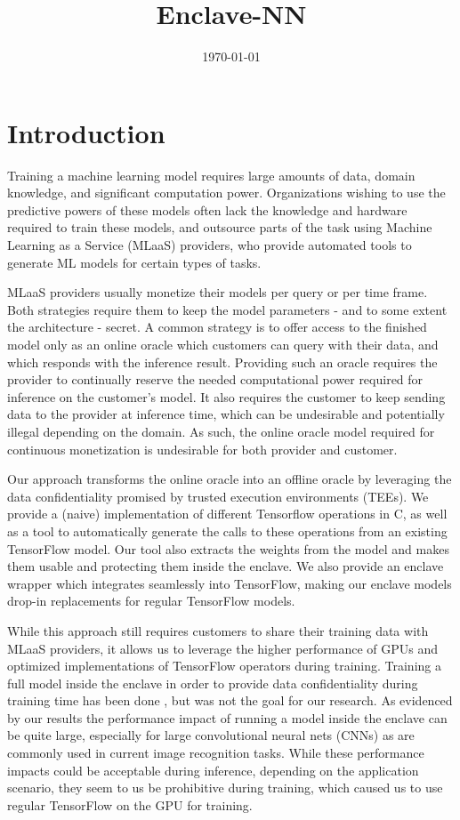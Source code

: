 \documentclass[11pt,twocolumn]{article}
\date{\today}
\title{Enclave-NN}
\newcommand{\tf}{TensorFlow}
\begin{document}
\maketitle

\section{Introduction}
\label{sec:introduction}

Training a machine learning model requires large amounts of data, domain knowledge, and significant computation power.
Organizations wishing to use the predictive powers of these models often lack the knowledge and hardware required to train these models, and outsource parts of the task using Machine Learning as a Service (MLaaS) providers, who provide automated tools to generate ML models for certain types of tasks.

MLaaS providers usually monetize their models per query or per time frame.
Both strategies require them to keep the model parameters - and to some extent the architecture - secret.
A common strategy is to offer access to the finished model only as an online oracle which customers can query with their data, and which responds with the inference result.
Providing such an oracle requires the provider to continually reserve the needed computational power required for inference on the customer's model.
It also requires the customer to keep sending data to the provider at inference time, which can be undesirable and potentially illegal depending on the domain.
As such, the online oracle model required for continuous monetization is undesirable for both provider and customer.

Our approach transforms the online oracle into an offline oracle by leveraging the data confidentiality promised by trusted execution environments (TEEs).
We provide a (naive) implementation of different Tensorflow operations in C, as well as a tool to automatically generate the calls to these operations from an existing \tf{} model.
Our tool also extracts the weights from the model and makes them usable and protecting them inside the enclave.
We also provide an enclave wrapper which integrates seamlessly into \tf{}, making our enclave models drop-in replacements for regular \tf{} models.

While this approach still requires customers to share their training data with MLaaS providers, it allows us to leverage the higher performance of GPUs and optimized implementations of \tf{} operators during training.
Training a full model inside the enclave in order to provide data confidentiality during training time has been done \cite{ohrimenko_oblivious_2016}, but was not the goal for our research.
As evidenced by our results the performance impact of running a model inside the enclave can be quite large, especially for large convolutional neural nets (CNNs) as are commonly used in current image recognition tasks.
While these performance impacts could be acceptable during inference, depending on the application scenario, they seem to us be prohibitive during training, which caused us to use regular \tf{} on the GPU for training.
\end{document}
